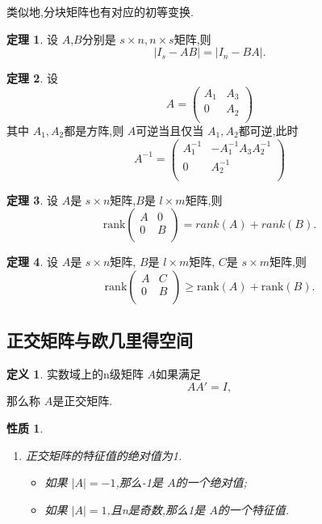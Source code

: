 \documentclass[a4paper,11pt]{article}%
\theoremstyle{remark}
\theoremstyle{definition}
\newtheorem{theorem}{定理}[section]
\theoremstyle{definition}
\newtheorem*{definition}{定义}
\theoremstyle{plain}
\newtheorem*{property}{性质}
\newcommand*{\abs}[1]{\lvert #1 \rvert}
\begin{document}
类似地,分块矩阵也有对应的初等变换.
\begin{theorem}
    设 $A$,$B$分别是 $s\times n,n\times s$矩阵,则
    \[\abs{I_s-AB}=\abs{I_n-BA}.\]
\end{theorem}
\begin{theorem}
    设
    \[
        A=
    \begin{pmatrix}
        A_1&A_3\\
        0& A_2\\
    \end{pmatrix}
        \]
        其中 $A_1,A_2$都是方阵,则 $A$可逆当且仅当 $A_1,A_2$都可逆,此时
        \[
            A^{-1}=
            \begin{pmatrix}
               A^{-1}_1&-A_1^{-1}A_3A_2^{-1}\\
               0&A_2^{-1}\\ 
            \end{pmatrix}\]
\end{theorem}
\begin{theorem}
    设 $A$是 $s\times n$矩阵,$B$是 $l\times m$矩阵,则
    \[
        \text{rank}
        \begin{pmatrix}
            A&0\\
            0&B\\
        \end{pmatrix}
        =rank(A)+rank(B).
        \]
\end{theorem}
\begin{theorem}
    设 $A$是 $s\times n$矩阵, $B$是 $l\times m$矩阵, $C$是 $s\times m$矩阵,则
    \[
        \text{rank}\begin{pmatrix}
            A&C\\
            0&B\\
        \end{pmatrix}
        \geq 
        \text{rank}(A)+\text{rank}(B).
        \]
\end{theorem}
\subsection{正交矩阵与欧几里得空间}
\begin{definition}
    实数域上的n级矩阵 $A$如果满足
    \[AA'=I,\]
    那么称 $A$是正交矩阵.
\end{definition}
\begin{property}
    \begin{enumerate}
        \item 正交矩阵的特征值的绝对值为1.
        \begin{itemize}
            \item 如果 $\abs{A}=-1$,那么-1是 $A$的一个绝对值;
            \item 如果 $\abs{A}=1$,且n是奇数,那么1是 $A$的一个特征值.
        \end{itemize}
    \end{enumerate}
\end{property}
\end{document}
